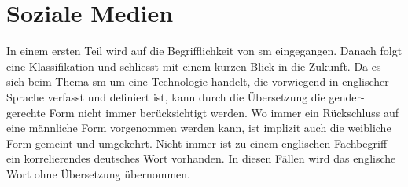%
%

\chapter{Soziale Medien}\label{chap.sm}
\glsresetall
In einem ersten Teil wird auf die Begrifflichkeit von \gls{sm} eingegangen. Danach folgt eine Klassifikation und schliesst mit einem kurzen Blick in die Zukunft.\newline
Da es sich beim Thema \gls{sm} um eine Technologie handelt, die vorwiegend in englischer Sprache verfasst und definiert ist, kann durch die Übersetzung die gender-gerechte Form nicht immer berücksichtigt werden. Wo immer ein Rückschluss auf eine männliche Form vorgenommen werden kann, ist implizit auch die weibliche Form gemeint und umgekehrt.  Nicht immer ist zu einem englischen Fachbegriff ein korrelierendes deutsches Wort vorhanden. In diesen Fällen wird das englische Wort ohne Übersetzung übernommen.
